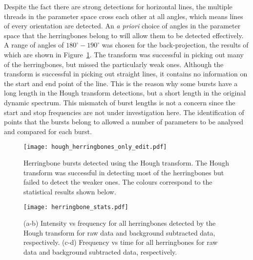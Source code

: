 Despite the fact there are strong detections for horizontal lines, the multiple threads in the parameter space cross each other at all angles, which means lines of every orientation are detected. An {\it a priori} choice of angles in the parameter space that the herringbones belong to will allow them to be detected effectively. A range of angles of $180^{\circ}-190^{\circ}$ was chosen for the back-projection, the results of which are shown in Figure~\ref{fig:hough_hb}. The transform was successful in picking out many of the herringbones, but missed the particularly weak ones. Although the transform is successful in picking out straight lines, it contains no information on the start and end point of the line. This is the reason why some bursts have a long length in the Hough transform detections, but a short length in the original dynamic spectrum. This mismatch of burst lengths is not a concern since the start and stop frequencies are not under investigation here. The identification of points that the bursts belong to allowed a number of parameters to be analysed and compared for each burst.
%
%
\begin{figure}[t!]
\begin{center}
\texttt{[image: hough\_herringbones\_only\_edit.pdf]}
\caption[Hough transform herringbones]{Herringbone bursts detected using the Hough transform. The Hough transform was successful in detecting most of the herringbones but failed to detect the weaker ones. The colours correspond to the statistical results shown below.}
\label{fig:hough_hb}
\end{center}
\end{figure}
%
%
\begin{figure}[t!]
\begin{center}
\texttt{[image: herringbone\_stats.pdf]}
\caption[Herringbone statistics 1]{(a-b) Intensity vs frequency for all herringbones detected by the Hough transform for raw data and background subtracted data, respectively. (c-d) Frequency vs time for all herringbones for raw data and background subtracted data, respectively.}
\label{fig:bibf}
\end{center}
\end{figure}



